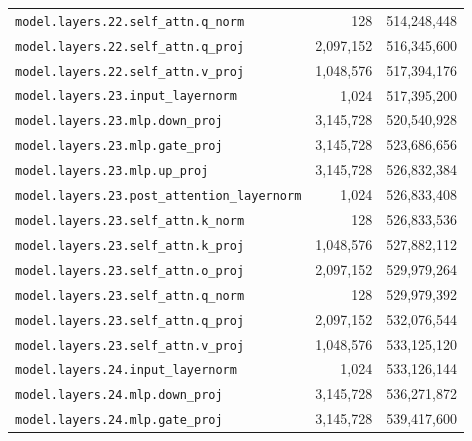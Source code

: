 \documentclass[10pt,a4paper]{article}
\theoremstyle{definition}
\begin{document}
\begin{appendices}
\begin{longtable}{p{9.5cm}rr}
\texttt{model.\allowbreak{}layers.\allowbreak{}22.\allowbreak{}self\_attn.\allowbreak{}q\_norm} & 128 & 514,248,448 \\
\texttt{model.\allowbreak{}layers.\allowbreak{}22.\allowbreak{}self\_attn.\allowbreak{}q\_proj} & 2,097,152 & 516,345,600 \\
\texttt{model.\allowbreak{}layers.\allowbreak{}22.\allowbreak{}self\_attn.\allowbreak{}v\_proj} & 1,048,576 & 517,394,176 \\
\texttt{model.\allowbreak{}layers.\allowbreak{}23.\allowbreak{}input\_layernorm} & 1,024 & 517,395,200 \\
\texttt{model.\allowbreak{}layers.\allowbreak{}23.\allowbreak{}mlp.\allowbreak{}down\_proj} & 3,145,728 & 520,540,928 \\
\texttt{model.\allowbreak{}layers.\allowbreak{}23.\allowbreak{}mlp.\allowbreak{}gate\_proj} & 3,145,728 & 523,686,656 \\
\texttt{model.\allowbreak{}layers.\allowbreak{}23.\allowbreak{}mlp.\allowbreak{}up\_proj} & 3,145,728 & 526,832,384 \\
\texttt{model.\allowbreak{}layers.\allowbreak{}23.\allowbreak{}post\_attention\_layernorm} & 1,024 & 526,833,408 \\
\texttt{model.\allowbreak{}layers.\allowbreak{}23.\allowbreak{}self\_attn.\allowbreak{}k\_norm} & 128 & 526,833,536 \\
\texttt{model.\allowbreak{}layers.\allowbreak{}23.\allowbreak{}self\_attn.\allowbreak{}k\_proj} & 1,048,576 & 527,882,112 \\
\texttt{model.\allowbreak{}layers.\allowbreak{}23.\allowbreak{}self\_attn.\allowbreak{}o\_proj} & 2,097,152 & 529,979,264 \\
\texttt{model.\allowbreak{}layers.\allowbreak{}23.\allowbreak{}self\_attn.\allowbreak{}q\_norm} & 128 & 529,979,392 \\
\texttt{model.\allowbreak{}layers.\allowbreak{}23.\allowbreak{}self\_attn.\allowbreak{}q\_proj} & 2,097,152 & 532,076,544 \\
\texttt{model.\allowbreak{}layers.\allowbreak{}23.\allowbreak{}self\_attn.\allowbreak{}v\_proj} & 1,048,576 & 533,125,120 \\
\texttt{model.\allowbreak{}layers.\allowbreak{}24.\allowbreak{}input\_layernorm} & 1,024 & 533,126,144 \\
\texttt{model.\allowbreak{}layers.\allowbreak{}24.\allowbreak{}mlp.\allowbreak{}down\_proj} & 3,145,728 & 536,271,872 \\
\texttt{model.\allowbreak{}layers.\allowbreak{}24.\allowbreak{}mlp.\allowbreak{}gate\_proj} & 3,145,728 & 539,417,600 \\

\end{longtable}
\end{appendices}
\end{document}
